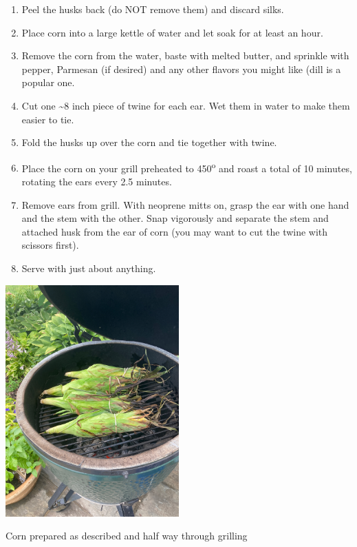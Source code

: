 \documentclass[
]{book}
\providecommand{\tightlist}{%
  \setlength{\itemsep}{0pt}\setlength{\parskip}{0pt}}
\begin{document}
\begin{enumerate}
\def\labelenumi{\arabic{enumi}.}
\tightlist
\item
  Peel the husks back (do NOT remove them) and discard silks.
\item
  Place corn into a large kettle of water and let soak for at least an hour.
\item
  Remove the corn from the water, baste with melted butter, and sprinkle with pepper, Parmesan (if desired) and any other flavors you might like (dill is a popular one.
\item
  Cut one \textasciitilde8 inch piece of twine for each ear. Wet them in water to make them easier to tie.
\item
  Fold the husks up over the corn and tie together with twine.
\item
  Place the corn on your grill preheated to 450\textsuperscript{o} and roast a total of 10 minutes, rotating the ears every 2.5 minutes.
\item
  Remove ears from grill. With neoprene mitts on, grasp the ear with one hand and the stem with the other. Snap vigorously and separate the stem and attached husk from the ear of corn (you may want to cut the twine with scissors first).
\item
  Serve with just about anything.
\end{enumerate}

\includegraphics[width=0.5\textwidth,height=\textheight]{images/cornongrill.jpeg}

Corn prepared as described and half way through grilling
\end{document}
